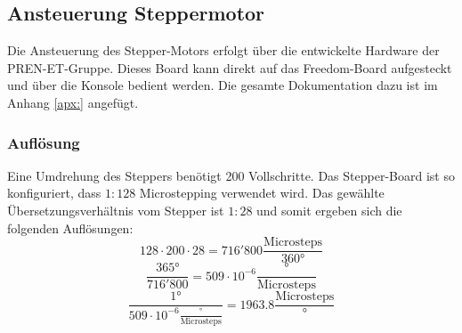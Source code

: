     \subsection{Ansteuerung Steppermotor}
        Die Ansteuerung des Stepper-Motors erfolgt über die entwickelte Hardware der PREN-ET-Gruppe. 
        Dieses Board kann direkt auf das Freedom-Board aufgesteckt und über die Konsole bedient 
        werden. Die gesamte Dokumentation dazu ist im Anhang \ref{apx:} angefügt. 
        
        \subsubsection{Auflösung}
        \label{sec:Aufloesung}
            Eine Umdrehung des Steppers benötigt 200 Vollschritte. Das Stepper-Board ist so konfiguriert, 
            dass $1:128$ Microstepping verwendet wird. Das gewählte Übersetzungsverhältnis vom 
            Stepper ist $1:28$ und somit ergeben sich die folgenden Auflösungen:
            \begin{equation}
                128 \cdot 200 \cdot 28 = 716'800\frac{\text{Microsteps}}{360\si{\degree}}
            \end{equation}
            \begin{equation}
                \frac{365\si{\degree}}{716'800} = 509 \cdot 10^{-6}\frac{\si{\degree}}{\text{Microsteps}}
            \end{equation}
            \begin{equation}
               \frac{1\si{\degree}}{509 \cdot 10^{-6}\frac{\si{\degree}}{\text{Microsteps}}} = 1963.8\frac{\text{Microsteps}}{\si{\degree}}
            \end{equation}
            
